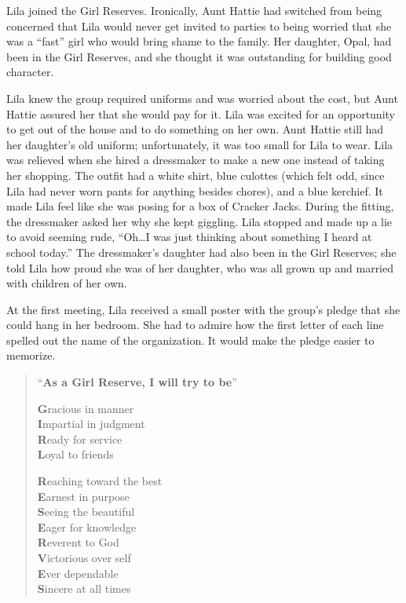 \documentclass[
  american,
  letterpaper,
]{book}
\begin{document}
Lila joined the Girl Reserves. Ironically, Aunt Hattie had switched from
being concerned that Lila would never get invited to parties to being
worried that she was a ``fast'' girl who would bring shame to the
family. Her daughter, Opal, had been in the Girl Reserves, and she
thought it was outstanding for building good character.

Lila knew the group required uniforms and was worried about the cost,
but Aunt Hattie assured her that she would pay for it. Lila was excited
for an opportunity to get out of the house and to do something on her
own. Aunt Hattie still had her daughter's old uniform; unfortunately, it
was too small for Lila to wear. Lila was relieved when she hired a
dressmaker to make a new one instead of taking her shopping. The outfit
had a white shirt, blue culottes (which felt odd, since Lila had never
worn pants for anything besides chores), and a blue kerchief. It made
Lila feel like she was posing for a box of Cracker Jacks. During the
fitting, the dressmaker asked her why she kept giggling. Lila stopped
and made up a lie to avoid seeming rude, ``Oh\ldots I was just thinking
about something I heard at school today.'' The dressmaker's daughter had
also been in the Girl Reserves; she told Lila how proud she was of her
daughter, who was all grown up and married with children of her own.

At the first meeting, Lila received a small poster with the group's
pledge that she could hang in her bedroom. She had to admire how the
first letter of each line spelled out the name of the organization. It
would make the pledge easier to memorize.

\begin{quote}
``\textbf{As a Girl Reserve, I will try to be}''

\textbf{G}racious in manner\\
\textbf{I}mpartial in judgment\\
\textbf{R}eady for service\\
\textbf{L}oyal to friends

\textbf{R}eaching toward the best\\
\textbf{E}arnest in purpose\\
\textbf{S}eeing the beautiful\\
\textbf{E}ager for knowledge\\
\textbf{R}everent to God\\
\textbf{V}ictorious over self\\
\textbf{E}ver dependable\\
\textbf{S}incere at all times
\end{quote}
\end{document}

